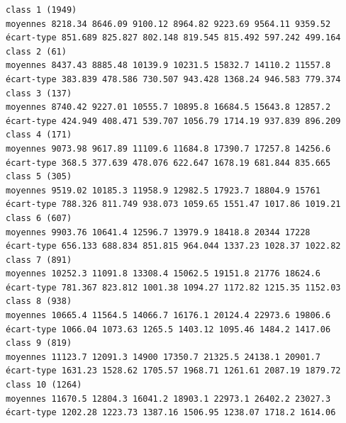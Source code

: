 \documentclass[environments,article,submit,pdftex,moreauthors]{Definitions/mdpi}
\begin{document}
\begin{scriptsize}
\begin{verbatim}
class 1 (1949)
moyennes 8218.34 8646.09 9100.12 8964.82 9223.69 9564.11 9359.52
écart-type 851.689 825.827 802.148 819.545 815.492 597.242 499.164
class 2 (61)
moyennes 8437.43 8885.48 10139.9 10231.5 15832.7 14110.2 11557.8
écart-type 383.839 478.586 730.507 943.428 1368.24 946.583 779.374
class 3 (137)
moyennes 8740.42 9227.01 10555.7 10895.8 16684.5 15643.8 12857.2
écart-type 424.949 408.471 539.707 1056.79 1714.19 937.839 896.209
class 4 (171)
moyennes 9073.98 9617.89 11109.6 11684.8 17390.7 17257.8 14256.6
écart-type 368.5 377.639 478.076 622.647 1678.19 681.844 835.665
class 5 (305)
moyennes 9519.02 10185.3 11958.9 12982.5 17923.7 18804.9 15761
écart-type 788.326 811.749 938.073 1059.65 1551.47 1017.86 1019.21
class 6 (607)
moyennes 9903.76 10641.4 12596.7 13979.9 18418.8 20344 17228
écart-type 656.133 688.834 851.815 964.044 1337.23 1028.37 1022.82
class 7 (891)
moyennes 10252.3 11091.8 13308.4 15062.5 19151.8 21776 18624.6
écart-type 781.367 823.812 1001.38 1094.27 1172.82 1215.35 1152.03
class 8 (938)
moyennes 10665.4 11564.5 14066.7 16176.1 20124.4 22973.6 19806.6
écart-type 1066.04 1073.63 1265.5 1403.12 1095.46 1484.2 1417.06
class 9 (819)
moyennes 11123.7 12091.3 14900 17350.7 21325.5 24138.1 20901.7
écart-type 1631.23 1528.62 1705.57 1968.71 1261.61 2087.19 1879.72
class 10 (1264)
moyennes 11670.5 12804.3 16041.2 18903.1 22973.1 26402.2 23027.3
écart-type 1202.28 1223.73 1387.16 1506.95 1238.07 1718.2 1614.06


\end{verbatim}
\end{scriptsize}
\end{document}

